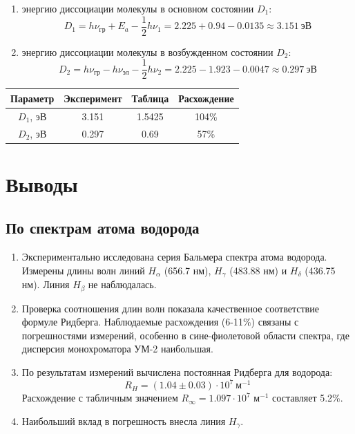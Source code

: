 \documentclass[a4paper,12pt]{article}
\begin{document}
\begin{enumerate}
\begin{enumerate}
        \item энергию диссоциации молекулы в основном состоянии $D_1$:
        $$
        D_1 = h\nu_{\text{гр}} + E_a - \frac{1}{2}h\nu_1 = 2.225 + 0.94 - 0.0135 \approx 3.151\ \text{эВ}
        $$

        \item энергию диссоциации молекулы в возбужденном состоянии $D_2$:
        $$
        D_2 = h\nu_{\text{гр}} - h\nu_{\text{эл}} - \frac{1}{2}h\nu_2 = 2.225 - 1.923 - 0.0047 \approx 0.297\ \text{эВ}
        $$
    \end{enumerate}

    \begin{table}[h!]
    \centering
    \begin{tabular}{||c|c|c|c||}
    \hline
    Параметр & Эксперимент & Таблица & Расхождение \\
    \hline
    \hline
    $D_1$, эВ & 3.151 & 1.5425 & 104\% \\
    \hline
    $D_2$, эВ & 0.297 & 0.69 & 57\% \\
    \hline
    \end{tabular}
    \end{table}   
\end{enumerate}

\section{Выводы}

\subsection{По спектрам атома водорода}

\begin{enumerate}
    \item Экспериментально исследована серия Бальмера спектра атома водорода. Измерены длины волн линий $H_\alpha$ (656.7 нм), $H_\gamma$ (483.88 нм) и $H_\delta$ (436.75 нм). Линия $H_\beta$ не наблюдалась.

    \item Проверка соотношения длин волн показала качественное соответствие формуле Ридберга. Наблюдаемые расхождения (6-11$\%$) связаны с погрешностями измерений, особенно в сине-фиолетовой области спектра, где дисперсия монохроматора УМ-2 наибольшая.

    \item По результатам измерений вычислена постоянная Ридберга для водорода:
    $$
    R_H = (1.04 \pm 0.03) \cdot 10^7\ \text{м}^{-1}
    $$
    Расхождение с табличным значением $R_\infty = 1.097 \cdot 10^7$ м$^{-1}$ составляет 5.2\%.

    \item Наибольший вклад в погрешность внесла линия $H_\gamma$.
\end{enumerate}
\end{document}
